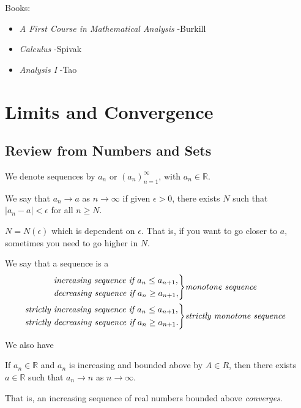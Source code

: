 Books:
\begin{itemize}
    \item \textit{A First Course in Mathematical Analysis} -Burkill
    \item \textit{Calculus} -Spivak
    \item \textit{Analysis I} -Tao
\end{itemize}
\section{Limits and Convergence}
\subsection{Review from Numbers and Sets}
\begin{notation}
    We denote sequences by \(a_n\) or \((a_n)^\infty_{n=1}\), with \(a_n \in \mathbb{R}\).
\end{notation}
\begin{definition}
    We say that \(a_n \to a\) as \(n \to \infty\) if given \(\epsilon > 0\), there exists \(N\) such that \(\left\vert a_{n}-a \right\vert < \epsilon \) for all \(n \geq N\).
\end{definition}
\begin{note}
    \(N = N(\epsilon)\) which is dependent on \(\epsilon\). That is, if you want to go closer to \(a\), sometimes you need to go higher in \(N\).
\end{note}
\begin{definition}
    We say that a sequence is a
    \begin{align*}
        \begin{rcases}
            \textit{increasing sequence if }a_n \leq a_{n+1},\\
            \textit{decreasing sequence if } a_n \geq a_{n+1},
        \end{rcases}&\textit{monotone sequence}\\
        \begin{rcases}
            \textit{strictly increasing sequence if }a_n \leq a_{n+1},\\
            \textit{strictly decreasing sequence if } a_n \geq a_{n+1}.
        \end{rcases}&\textit{strictly monotone sequence}\\
    \end{align*}
\end{definition}
We also have
\begin{theorem}
    If \(a_n \in \mathbb{R}\) and \(a_n\) is increasing and bounded above by \(A \in R\), then there exists \(a \in \mathbb{R}\) such that \(a_n \to n\) as \(n \to \infty \).

    That is, an increasing sequence of real numbers bounded above \textit{converges}.
\end{theorem}
